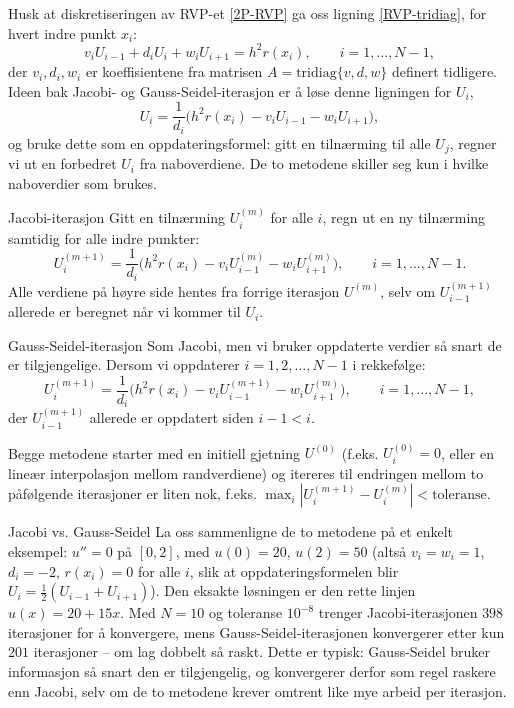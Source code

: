 Husk at diskretiseringen av RVP-et \eqref{2P-RVP} ga oss ligning \eqref{RVP-tridiag}, for hvert indre punkt $x_i$:
\[
v_i U_{i-1} + d_i U_i + w_i U_{i+1} = h^2 r(x_i), \qquad i=1,\ldots,N-1,
\]
der $v_i,d_i,w_i$ er koeffisientene fra matrisen $A=\text{tridiag}\{v,d,w\}$ definert tidligere. Ideen bak Jacobi- og Gauss-Seidel-iterasjon er å løse denne ligningen for $U_i$,
\[
U_i = \frac{1}{d_i}\Big(h^2r(x_i) - v_iU_{i-1} - w_iU_{i+1}\Big),
\]
og bruke dette som en oppdateringsformel: gitt en tilnærming til alle $U_j$, regner vi ut en forbedret $U_i$ fra naboverdiene. De to metodene skiller seg kun i hvilke naboverdier som brukes.

\begin{defn}{Jacobi-iterasjon}
Gitt en tilnærming $U_i^{(m)}$ for alle $i$, regn ut en ny tilnærming samtidig for alle indre punkter:
\[
U_i^{(m+1)} = \frac{1}{d_i}\Big(h^2r(x_i) - v_iU_{i-1}^{(m)} - w_iU_{i+1}^{(m)}\Big), \qquad i=1,\ldots,N-1.
\]
Alle verdiene på høyre side hentes fra forrige iterasjon $U^{(m)}$, selv om $U_{i-1}^{(m+1)}$ allerede er beregnet når vi kommer til $U_i$.
\end{defn}

\begin{defn}{Gauss-Seidel-iterasjon}
Som Jacobi, men vi bruker oppdaterte verdier så snart de er tilgjengelige. Dersom vi oppdaterer $i=1,2,\ldots,N-1$ i rekkefølge:
\[
U_i^{(m+1)} = \frac{1}{d_i}\Big(h^2r(x_i) - v_iU_{i-1}^{(m+1)} - w_iU_{i+1}^{(m)}\Big), \qquad i=1,\ldots,N-1,
\]
der $U_{i-1}^{(m+1)}$ allerede er oppdatert siden $i-1 < i$.
\end{defn}

Begge metodene starter med en initiell gjetning $U^{(0)}$ (f.eks. $U_i^{(0)}=0$, eller en lineær interpolasjon mellom randverdiene) og itereres til endringen mellom to påfølgende iterasjoner er liten nok, f.eks. $\max_i|U_i^{(m+1)}-U_i^{(m)}|<\text{toleranse}$.

\begin{eks}{Jacobi vs. Gauss-Seidel}
La oss sammenligne de to metodene på et enkelt eksempel: $u''=0$ på $[0,2]$, med $u(0)=20$, $u(2)=50$ (altså $v_i=w_i=1$, $d_i=-2$, $r(x_i)=0$ for alle $i$, slik at oppdateringsformelen blir $U_i=\frac12(U_{i-1}+U_{i+1})$). Den eksakte løsningen er den rette linjen $u(x)=20+15x$. Med $N=10$ og toleranse $10^{-8}$ trenger Jacobi-iterasjonen $398$ iterasjoner for å konvergere, mens Gauss-Seidel-iterasjonen konvergerer etter kun $201$ iterasjoner -- om lag dobbelt så raskt. Dette er typisk: Gauss-Seidel bruker informasjon så snart den er tilgjengelig, og konvergerer derfor som regel raskere enn Jacobi, selv om de to metodene krever omtrent like mye arbeid per iterasjon.
\end{eks}

